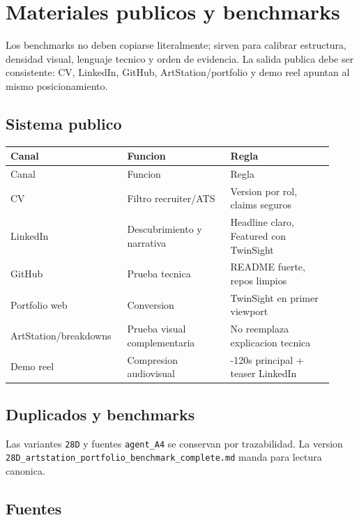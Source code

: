 \chapter{Materiales publicos y benchmarks}


Los benchmarks no deben copiarse literalmente; sirven para calibrar estructura, densidad visual, lenguaje tecnico y orden de evidencia. La salida publica debe ser consistente: CV, LinkedIn, GitHub, ArtStation/portfolio y demo reel apuntan al mismo posicionamiento.


\section{Sistema publico}


\begin{center}
\scriptsize
\begin{longtable}{>{\raggedright\arraybackslash}p{0.305\linewidth} >{\raggedright\arraybackslash}p{0.305\linewidth} >{\raggedright\arraybackslash}p{0.305\linewidth}}
\toprule
Canal & Funcion & Regla \\
\midrule
\endfirsthead
\toprule
Canal & Funcion & Regla \\
\midrule
\endhead
CV & Filtro recruiter/ATS & Version por rol, claims seguros \\
LinkedIn & Descubrimiento y narrativa & Headline claro, Featured con TwinSight \\
GitHub & Prueba tecnica & README fuerte, repos limpios \\
Portfolio web & Conversion & TwinSight en primer viewport \\
ArtStation/breakdowns & Prueba visual complementaria & No reemplaza explicacion tecnica \\
Demo reel & Compresion audiovisual & 90-120s principal + teaser LinkedIn \\
\bottomrule
\end{longtable}
\end{center}


\section{Duplicados y benchmarks}


Las variantes \texttt{28D} y fuentes \texttt{agent\_A4} se conservan por trazabilidad. La version \texttt{28D\_artstation\_portfolio\_benchmark\_complete.md} manda para lectura canonica.


\section{Fuentes}


